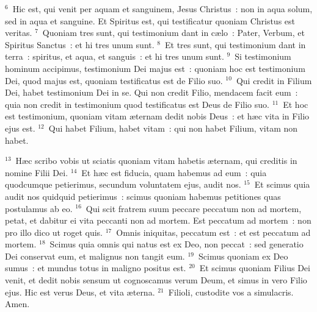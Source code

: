 ${}^{6}$~Hic est, qui venit per aquam et sanguinem, Jesus Christus~: non in aqua solum, sed in aqua et sanguine. Et Spiritus est, qui testificatur quoniam Christus est veritas.
${}^{7}$~Quoniam tres sunt, qui testimonium dant in c\ae lo~: Pater, Verbum, et Spiritus Sanctus~: et hi tres unum sunt.
${}^{8}$~Et tres sunt, qui testimonium dant in terra~: spiritus, et aqua, et sanguis~: et hi tres unum sunt.
${}^{9}$~Si testimonium hominum accipimus, testimonium Dei majus est~: quoniam hoc est testimonium Dei, quod majus est, quoniam testificatus est de Filio suo.
${}^{10}$~Qui credit in Filium Dei, habet testimonium Dei in se. Qui non credit Filio, mendacem facit eum~: quia non credit in testimonium quod testificatus est Deus de Filio suo.
${}^{11}$~Et hoc est testimonium, quoniam vitam \ae ternam dedit nobis Deus~: et h\ae c vita in Filio ejus est.
${}^{12}$~Qui habet Filium, habet vitam~: qui non habet Filium, vitam non habet.


${}^{13}$~H\ae c scribo vobis ut sciatis quoniam vitam habetis \ae ternam, qui creditis in nomine Filii Dei.
${}^{14}$~Et h\ae c est fiducia, quam habemus ad eum~: quia quodcumque petierimus, secundum voluntatem ejus, audit nos.
${}^{15}$~Et scimus quia audit nos quidquid petierimus~: scimus quoniam habemus petitiones quas postulamus ab eo.
${}^{16}$~Qui scit fratrem suum peccare peccatum non ad mortem, petat, et dabitur ei vita peccanti non ad mortem. Est peccatum ad mortem~: non pro illo dico ut roget quis.
${}^{17}$~Omnis iniquitas, peccatum est~: et est peccatum ad mortem.
${}^{18}$~Scimus quia omnis qui natus est ex Deo, non peccat~: sed generatio Dei conservat eum, et malignus non tangit eum.
${}^{19}$~Scimus quoniam ex Deo sumus~: et mundus totus in maligno positus est.
${}^{20}$~Et scimus quoniam Filius Dei venit, et dedit nobis sensum ut cognoscamus verum Deum, et simus in vero Filio ejus. Hic est verus Deus, et vita \ae terna.
${}^{21}$~Filioli, custodite vos a simulacris. Amen.
